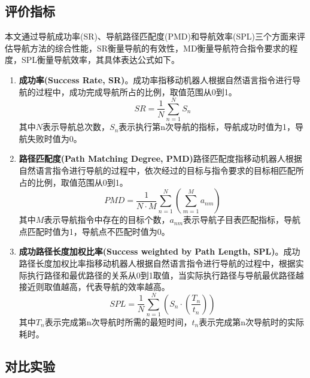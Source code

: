 \subsection{评价指标}
本文通过导航成功率(SR)、导航路径匹配度(PMD)和导航效率(SPL)三个方面来评估导航方法的综合性能，SR衡量导航的有效性，MD衡量导航符合指令要求的程度，SPL衡量导航效率，其具体表达公式如下。
\begin{enumerate}[topsep = 0 pt, itemsep= 0 pt, parsep=0pt, partopsep=0pt, leftmargin=44pt, itemindent=0pt, labelsep=6pt, label=(\arabic*)]
    \item 	\textbf{成功率(Success Rate, SR)}。成功率指移动机器人根据自然语言指令进行导航的过程中，成功完成导航所占的比例，取值范围从0到1。
    \begin{equation}
        SR = \frac{1}{N}\sum\limits_{n = 1}^N {{S_n}} 
        \label{myeq51}
    \end{equation}
    其中$N$表示导航总次数，${S_n}$表示执行第n次导航的指标，导航成功时值为1，导航失败时值为0。
    \item	\textbf{路径匹配度(Path Matching Degree, PMD)}路径匹配度指移动机器人根据自然语言指令进行导航的过程中，依次经过的目标与指令要求的目标相匹配所占的比例，取值范围从0到1。
    \begin{equation}
        PMD = \frac{1}{{N \cdot M}}\sum\limits_{n = 1}^N {\left( {\sum\limits_{m = 1}^M {{a_{nm}}} } \right)} 
        \label{myeq53}
    \end{equation}
    其中$M$表示导航指令中存在的目标个数，$a_{nm}$表示导航子目表匹配指标，导航点匹配时值为1，导航点不匹配时值为0。
    \item	\textbf{成功路径长度加权比率(Success weighted by Path Length, SPL)}。成功路径长度加权比率指移动机器人根据自然语言指令进行导航的过程中，根据实际执行路径和最优路径的关系从0到1取值，当实际执行路径与导航最优路径越接近则取值越高，代表导航的效率越高。
    \begin{equation}
SPL = \frac{1}{N}\sum\limits_{n = 1}^N {\left( {{S_n} \cdot \left( {\frac{{{T_n}}}{{{t_n}}}} \right)} \right)} 
        \label{myeq53}
    \end{equation}
    其中$T_{n}$表示完成第n次导航时所需的最短时间，$t_{n}$表示完成第n次导航时的实际耗时。
\end{enumerate}






\subsection{对比实验}

